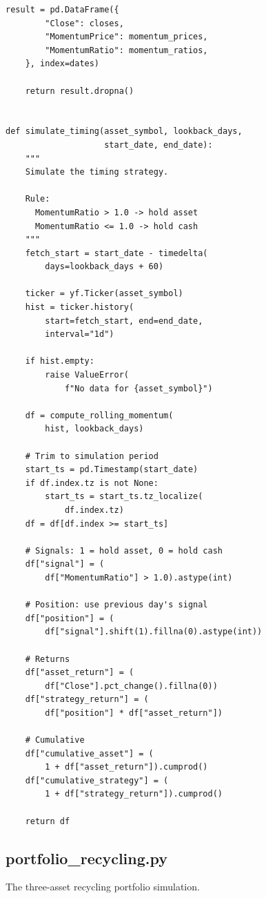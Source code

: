 \documentclass[11pt,a4paper]{article}
\begin{document}
\begin{codebox}
\begin{lstlisting}[style=python]
    result = pd.DataFrame({
        "Close": closes,
        "MomentumPrice": momentum_prices,
        "MomentumRatio": momentum_ratios,
    }, index=dates)

    return result.dropna()


def simulate_timing(asset_symbol, lookback_days,
                    start_date, end_date):
    """
    Simulate the timing strategy.

    Rule:
      MomentumRatio > 1.0 -> hold asset
      MomentumRatio <= 1.0 -> hold cash
    """
    fetch_start = start_date - timedelta(
        days=lookback_days + 60)

    ticker = yf.Ticker(asset_symbol)
    hist = ticker.history(
        start=fetch_start, end=end_date,
        interval="1d")

    if hist.empty:
        raise ValueError(
            f"No data for {asset_symbol}")

    df = compute_rolling_momentum(
        hist, lookback_days)

    # Trim to simulation period
    start_ts = pd.Timestamp(start_date)
    if df.index.tz is not None:
        start_ts = start_ts.tz_localize(
            df.index.tz)
    df = df[df.index >= start_ts]

    # Signals: 1 = hold asset, 0 = hold cash
    df["signal"] = (
        df["MomentumRatio"] > 1.0).astype(int)

    # Position: use previous day's signal
    df["position"] = (
        df["signal"].shift(1).fillna(0).astype(int))

    # Returns
    df["asset_return"] = (
        df["Close"].pct_change().fillna(0))
    df["strategy_return"] = (
        df["position"] * df["asset_return"])

    # Cumulative
    df["cumulative_asset"] = (
        1 + df["asset_return"]).cumprod()
    df["cumulative_strategy"] = (
        1 + df["strategy_return"]).cumprod()

    return df
\end{lstlisting}
\end{codebox}




\subsection{portfolio\_recycling.py}

The three-asset recycling portfolio simulation.
\end{document}
